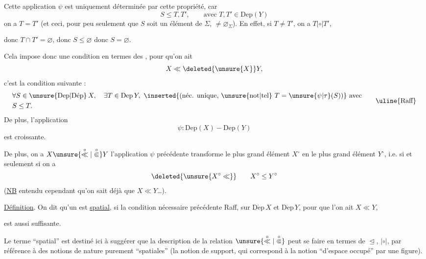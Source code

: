 Cette application $\psi$ est uniquement déterminée par cette propriété, car  
\[
S\leq T,T',\qquad\text{avec }T,T'\in\mathrm{Dep}(Y)
\]
on a $T=T'$ (et ceci, pour peu seulement que $S$ soit un élément de $\Sigma$, $\ne\varnothing_\Sigma$). En effet, si $T\ne T'$, on a $T\mathrel{|\circ|}T'$,

donc $T\cap T'=\varnothing$, donc $S\leq\varnothing$ donc $S=\varnothing$.

Cela impose donc une condition  en termes des  , pour qu'on ait
\[
X\ll\deleted{\unsure{X}}Y,
\]
c'est la condition suivante :
\[
\begin{aligned}
&\forall S\in\unsure{\mathrm{Dep}|\mathrm{D\acute{e}p}}\,X,\quad\exists T\in\mathrm{Dep}\,Y,\ \inserted{\text{(néc. unique, \unsure{not|tel} }T=\unsure{\psi|\tau}(S)\text{)}}\ \text{avec}\\
&S\leq T.
\end{aligned}
\tag*{\uline{Raff}}
\]
De plus, l'application
\[
\psi:\mathrm{Dep}(X)\mathbin{-}\mathrm{Dep}(Y)
\]
est croissante.

De plus, on a $X\unsure{\overset{\circ}{\ll}|\overset{\circ}{\Subset}}Y$  l'application $\psi$ précédente transforme le plus grand élément $X^{\circ}$ en le plus grand élément $Y^{\circ}$, i.e. si et seulement si on a
\[
\deleted{\unsure{X^{\circ}\ll}}\qquad X^{\circ}\leq Y^{\circ}
\]
(\uline{NB}  entendu cependant qu'on sait déjà que $X\ll Y$\dots).


\uline{Définition}. On dit qu'un   est \uline{spatial}, si la condition nécessaire précédente Raff, sur $\mathrm{D\acute{e}p}\,X$ et $\mathrm{D\acute{e}p}\,Y$, pour que l'on ait $X\ll Y$,

est aussi suffisante.

Le terme ``spatial''  est destiné ici à suggérer que la description de la relation  $\unsure{\overset{\circ}{\ll}|\overset{\circ}{\Subset}}$ peut se faire en termes de $\trianglelefteq$, $\mathrel{|\circ|}$, par référence à des notions de nature purement ``spatiales'' (la notion de support, qui  correspond à la notion ``d'espace occupé'' par une figure).


